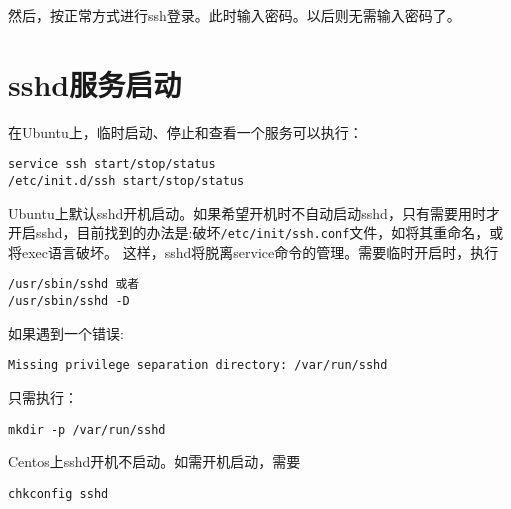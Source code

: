 然后，按正常方式进行ssh登录。此时输入密码。以后则无需输入密码了。

\section{sshd服务启动}
在Ubuntu上，临时启动、停止和查看一个服务可以执行：
\begin{verbatim}
service ssh start/stop/status
/etc/init.d/ssh start/stop/status
\end{verbatim}

Ubuntu上默认sshd开机启动。如果希望开机时不自动启动sshd，只有需要用时才开启sshd，目前找到的办法是:破坏\verb+/etc/init/ssh.conf+文件，如将其重命名，或将exec语言破坏。
这样，sshd将脱离service命令的管理。需要临时开启时，执行
\begin{verbatim}
/usr/sbin/sshd 或者
/usr/sbin/sshd -D
\end{verbatim}

如果遇到一个错误:
\begin{verbatim}
Missing privilege separation directory: /var/run/sshd
\end{verbatim}

只需执行：
\begin{verbatim}
mkdir -p /var/run/sshd
\end{verbatim}

Centos上sshd开机不启动。如需开机启动，需要
\begin{verbatim}
chkconfig sshd
\end{verbatim}





